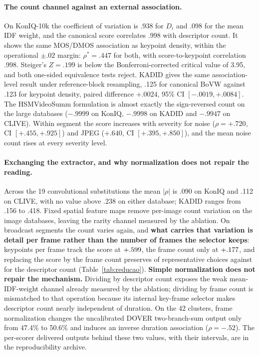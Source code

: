 \documentclass[sn-basic,Numbered]{sn-jnl}
\begin{document}
\paragraph{The count channel against an external association.} On KonIQ-10k the
coefficient of variation is .938 for $D_i$ and .098 for the mean IDF weight, and the
canonical score correlates .998 with descriptor count. It shows the same MOS/DMOS
association as keypoint density, within the operational $\pm.02$ margin: $\rho^{*}=.447$
for both, with score-to-keypoint correlation .998. Steiger's $Z=.199$ is below the
Bonferroni-corrected critical value of 3.95, and both one-sided equivalence tests reject.
KADID gives the same association-level result under reference-block resampling, .125 for
canonical BoVW against .123 for keypoint density, paired difference $+.0024$, 95\% CI
$[-.0019,+.0084]$. The HSMVideoSumm formulation is almost exactly the sign-reversed count on
the large databases ($-.9999$ on KonIQ, $-.9998$ on KADID and $-.9947$ on CLIVE). Within
segment the score increases with severity for noise ($\rho=+.720$, CI $[+.455,+.925]$) and
JPEG ($+.640$, CI $[+.395,+.850]$), and the mean noise count rises at every severity level.

\paragraph{Exchanging the extractor, and why normalization does not repair the reading.}
Across the 19 convolutional substitutions the mean $|\rho|$ is .090 on KonIQ and .112 on
CLIVE, with no value above .238 on either database; KADID ranges from .156 to .418. Fixed
spatial feature maps remove per-image count variation on the image databases, leaving the
rarity channel measured by the ablation. On broadcast segments the count varies again, and
\textbf{what carries that variation is detail per frame rather than the number of frames
the selector keeps}: keypoints per frame track the score at $+.599{}$, the frame
count only at $+.177{}$, and replacing the score by the frame count preserves
\redQuadros{} of \redDe{} representative choices against \redEscolhas{} for the
descriptor count (Table~\ref{tab:reducao}). \textbf{Simple normalization does not repair
the mechanism.} Dividing by descriptor count exposes the weak mean-IDF-weight channel
already measured by the ablation; dividing by frame count is mismatched to that operation
because its internal key-frame selector makes descriptor count nearly independent of
duration. On the 42 clusters, frame normalization changes the uncalibrated DOVER
two-branch-sum output only from 47.4\% to 50.6\% and induces an inverse duration
association ($\rho=-.52$). The per-scorer delivered outputs behind these two values, with
their intervals, are in the reproducibility archive.
\end{document}
